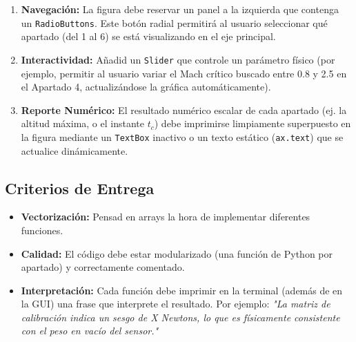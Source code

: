 	\begin{enumerate}
		\item \textbf{Navegación:} La figura debe reservar un panel a la izquierda que contenga un \texttt{RadioButtons}. Este botón radial permitirá al usuario seleccionar qué apartado (del 1 al 6) se está visualizando en el eje principal.
		\item \textbf{Interactividad:} Añadid un \texttt{Slider} que controle un parámetro físico (por ejemplo, permitir al usuario variar el Mach crítico buscado entre 0.8 y 2.5 en el Apartado 4, actualizándose la gráfica automáticamente).
		\item \textbf{Reporte Numérico:} El resultado numérico escalar de cada apartado (ej. la altitud máxima, o el instante $t_c$) debe imprimirse limpiamente superpuesto en la figura mediante un \texttt{TextBox} inactivo o un texto estático (\texttt{ax.text}) que se actualice dinámicamente.
	\end{enumerate}
	
	\subsection*{Criterios de Entrega}
	
	\begin{itemize}
		\item \textbf{Vectorización:}  
		Pensad en arrays  la hora de implementar diferentes funciones.
	
		\item \textbf{Calidad:} 
		El código debe estar modularizado 
		(una función de Python por apartado) y correctamente comentado.
		\item \textbf{Interpretación:} 
		Cada función debe imprimir en la terminal 
		(además de en la GUI) una frase que interprete el resultado. 
		Por ejemplo: \textit{"La matriz de calibración indica un sesgo de X Newtons, lo que es físicamente consistente con el peso en vacío del sensor."}
	\end{itemize}
	
